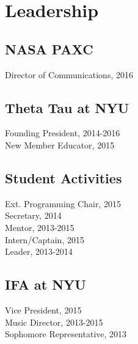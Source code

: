 \documentclass[]{deedy-resume-openfont}
\begin{document}
\begin{minipage}[t]{0.33\textwidth}
\section{Leadership}

\subsection{NASA PAXC}
Director of Communications, 2016\\
\sectionsep

\subsection{Theta Tau at NYU}

Founding President, 2014-2016 \\
New Member Educator, 2015 \\
\sectionsep

\subsection{Student Activities}
Ext. Programming Chair, 2015\\
Secretary, 2014 \\
Mentor, 2013-2015\\
Intern/Captain, 2015\\
Leader, 2013-2014
\sectionsep

\subsection{IFA at NYU}
Vice President, 2015\\
Music Director, 2013-2015\\
Sophomore Representative, 2013

\sectionsep



%
%

\end{minipage} 
\hfill
\end{document}
